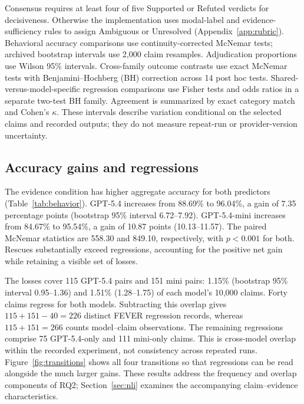 \documentclass[11pt,letterpaper]{article}
\begin{document}
Consensus requires at least four of five Supported or Refuted verdicts for decisiveness. Otherwise the implementation uses modal-label and evidence-sufficiency rules to assign Ambiguous or Unresolved (Appendix~\ref{app:rubric}). Behavioral accuracy comparisons use continuity-corrected McNemar tests; archived bootstrap intervals use 2,000 claim resamples. Adjudication proportions use Wilson 95\% intervals. Cross-family outcome contrasts use exact McNemar tests with Benjamini--Hochberg (BH) correction across 14 post hoc tests. Shared-versus-model-specific regression comparisons use Fisher tests and odds ratios in a separate two-test BH family. Agreement is summarized by exact category match and Cohen's $\kappa$. These intervals describe variation conditional on the selected claims and recorded outputs; they do not measure repeat-run or provider-version uncertainty.

\subsection{Accuracy gains and regressions}\label{sec:behavior}
The evidence condition has higher aggregate accuracy for both predictors (Table~\ref{tab:behavior}). GPT-5.4 increases from 88.69\% to 96.04\%, a gain of 7.35 percentage points (bootstrap 95\% interval 6.72--7.92). GPT-5.4-mini increases from 84.67\% to 95.54\%, a gain of 10.87 points (10.13--11.57). The paired McNemar statistics are 558.30 and 849.10, respectively, with $p<0.001$ for both. Rescues substantially exceed regressions, accounting for the positive net gain while retaining a visible set of losses.

The losses cover 115 GPT-5.4 pairs and 151 mini pairs: 1.15\% (bootstrap 95\% interval 0.95--1.36) and 1.51\% (1.28--1.75) of each model's 10,000 claims. Forty claims regress for both models. Subtracting this overlap gives $115+151-40=226$ distinct FEVER regression records, whereas $115+151=266$ counts model--claim observations. The remaining regressions comprise 75 GPT-5.4-only and 111 mini-only claims. This is cross-model overlap within the recorded experiment, not consistency across repeated runs. Figure~\ref{fig:transitions} shows all four transitions so that regressions can be read alongside the much larger gains. These results address the frequency and overlap components of RQ2; Section~\ref{sec:nli} examines the accompanying claim--evidence characteristics.
\end{document}
